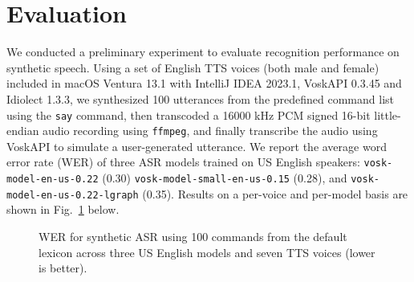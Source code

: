 \documentclass[conference]{IEEEtran}
\begin{document}
\section{Evaluation}

We conducted a preliminary experiment to evaluate recognition performance on synthetic speech. Using a set of English TTS voices (both male and female) included in macOS Ventura 13.1 with IntelliJ IDEA 2023.1, VoskAPI 0.3.45 and Idiolect 1.3.3, we synthesized 100 utterances from the predefined command list using the \texttt{say} command, then transcoded a 16000 kHz PCM signed 16-bit little-endian audio recording using \texttt{ffmpeg}, and finally transcribe the audio using VoskAPI to simulate a user-generated utterance. We report the average word error rate (WER) of three ASR models trained on US English speakers: \texttt{vosk-model-en-us-0.22} (0.30) \texttt{vosk-model-small-en-us-0.15} (0.28), and \texttt{vosk-model-en-us-0.22-lgraph} (0.35). Results on a per-voice and per-model basis are shown in  Fig.~\ref{fig:fig1} below.

\begin{figure}[ht!]
    \centering
    \begin{table}
    \end{table}
    \caption{WER for synthetic ASR using 100 commands from the default lexicon across three US English models and seven TTS voices (lower is better).}
    \label{fig:fig1}
\end{figure}
\end{document}

